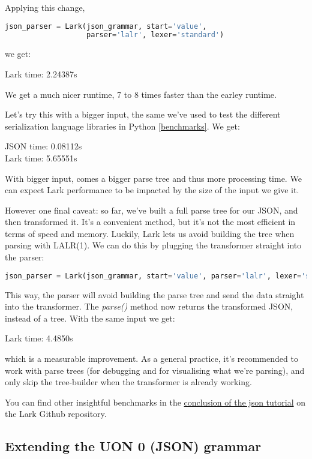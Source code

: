 \documentclass[12pt]{article}
\begin{document}
Applying this change,
\begin{lstlisting}[language=Python]
json_parser = Lark(json_grammar, start='value',
                   parser='lalr', lexer='standard')
\end{lstlisting}
we get:

Lark time:  2.24387s

We get a much nicer runtime, 7 to 8 times faster than the earley runtime.

Let's try this with a bigger input, the same we've used to test the different serialization language libraries in Python \ref{benchmarks}. We get:

JSON time:  0.08112s \\
Lark time:  5.65551s

With bigger input, comes a bigger parse tree and thus more processing time. We can expect Lark performance to be impacted by the size of the input we give it.

However one final caveat: so far, we've built a full parse tree for our JSON, and then transformed it. It's a convenient method, but it's not the most efficient in terms of speed and memory. Luckily, Lark lets us avoid building the tree when parsing with LALR(1). We can do this by plugging the transformer straight into the parser:

\begin{lstlisting}[language=Python]
json_parser = Lark(json_grammar, start='value', parser='lalr', lexer='standard', transformer=TreeToJson())
\end{lstlisting}

This way, the parser will avoid building the parse tree and send the data straight into the transformer. The \emph{parse()} method now returns the transformed JSON, instead of a tree. With the same input we get:

Lark time:  4.4850s

which is a measurable improvement. As a general practice, it's recommended to work with parse trees (for debugging and for visualising what we're parsing), and only skip the tree-builder when the transformer is already working.

You can find other insightful benchmarks in the \href{https://github.com/lark-parser/lark/blob/master/docs/json_tutorial.md}{conclusion of the json tutorial} on the Lark Github repository.

\pagebreak

\subsection{Extending the UON 0 (JSON) grammar}
\end{document}

